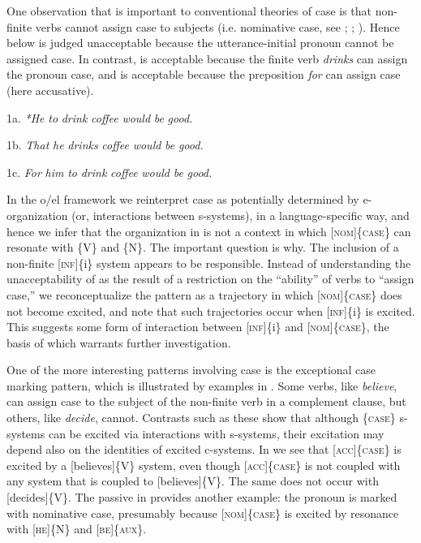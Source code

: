  One observation that is important to conventional theories of case is that non-finite verbs cannot assign case to subjects (i.e. nominative case, see \citealt{Chomsky1980}; \citealt{ChomskyLasnik1977}; \citealt{Vergnaud2006}). Hence  below is judged unacceptable because the utterance-initial pronoun cannot be assigned case. In contrast,  is acceptable because the finite verb \textit{drinks} can assign the pronoun case, and  is acceptable because the preposition \textit{for} can assign case (here accusative).

  1a. \textit{*He} \textit{to} \textit{drink} \textit{coffee} \textit{would} \textit{be} \textit{good.}

  1b.  \textit{That} \textit{he} \textit{drinks} \textit{coffee} \textit{would} \textit{be} \textit{good.}

  1c.  \textit{For} \textit{him} \textit{to} \textit{drink} \textit{coffee} \textit{would} \textit{be} \textit{good.}

  In the o/el framework we reinterpret case as potentially determined by e-organization (or, interactions between s-systems), in a language-specific way, and hence we infer that the organization in  is not a context in which [\textsc{nom}]\{\textsc{case}\} can resonate with \{V\} and \{N\}. The important question is why. The inclusion of a non-finite [\textsc{inf}]\{i\} system appears to be responsible. Instead of understanding the unacceptability of  as the result of a restriction on the “ability” of verbs to “assign case,” we reconceptualize the pattern as a trajectory in which [\textsc{nom}]\{\textsc{case}\} does not become excited, and note that such trajectories occur when [\textsc{inf}]\{i\} is excited. This suggests some form of interaction between [\textsc{inf}]\{i\} and [\textsc{nom}]\{\textsc{case}\}, the basis of which warrants further investigation.

  One of the more interesting patterns involving case is the exceptional case marking pattern, which is illustrated by examples in . Some verbs, like \textit{believe}, can assign case to the subject of the non-finite verb in a complement clause, but others, like \textit{decide}, cannot. Contrasts such as these show that although \{\textsc{case}\} s-systems can be excited via interactions with s-systems, their excitation may depend also on the identities of excited c-systems. In  we see that \textsc{[acc]\{case\}} is excited by a [believes]\{V\} system, even though \textsc{[acc]\{case\}} is not coupled with any system that is coupled to [believes]\{V\}. The same does not occur with [decides]\{V\}. The passive in  provides another example: the pronoun is marked with nominative case, presumably because [\textsc{nom}]\{\textsc{case}\} is excited by resonance with [\textsc{he}]\{N\} and [\textsc{be}]\{\textsc{aux}\}.


